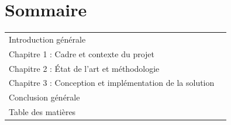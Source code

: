 \chapter*{Sommaire}

\renewcommand{\arraystretch}{2}
\noindent
\begin{tabular}{@{}p{}r@{}}
Introduction générale \dotfill & \pageref{ch:intro} \\
Chapitre 1 : Cadre et contexte du projet \dotfill & \pageref{chap:contexte} \\
Chapitre 2 : État de l'art et méthodologie \dotfill & \pageref{chap:etatart} \\
Chapitre 3 : Conception et implémentation de la solution \dotfill & \pageref{chap:conception} \\
Conclusion générale \dotfill & \pageref{ch:conclusion} \\
Table des matières \dotfill & \pageref{ch:toc} \\
\end{tabular}
\renewcommand{\arraystretch}{1}
